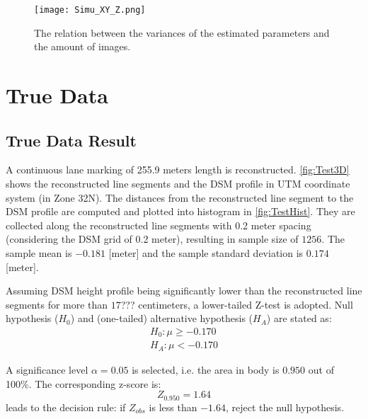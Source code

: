 \begin{figure}
  \centering
  \texttt{[image: Simu\_XY\_Z.png]}
  \caption{\small The relation between the variances of the estimated parameters and the amount of images.}
  \label{fig:SimuSigmaxx}
\end{figure}

\clearpage
\section{True Data}
\label{sec:truedata}

\subsection{True Data Result}
\label{subsec:trueresult}

A continuous lane marking of 255.9 meters length is reconstructed. \cref{fig:Test3D} shows the reconstructed line segments and the DSM profile in UTM coordinate system (in Zone 32N). The distances from the reconstructed line segment to the DSM profile are computed and plotted into histogram in \cref{fig:TestHist}. They are collected along the reconstructed line segments with 0.2 meter spacing (considering the DSM grid of 0.2 meter), resulting in sample size of $1256$. The sample mean is $-0.181$ [meter] and the sample standard deviation is $0.174$ [meter]. %

Assuming DSM height profile being significantly lower than the reconstructed line segments for more than $17$??? centimeters, a lower-tailed Z-test is adopted. Null hypothesis ($H_0$) and (one-tailed) alternative hypothesis ($H_A$) are stated as:
\begin{equation*}
\begin{split}
H_0: \mu\geq-0.170\\
H_A: \mu<-0.170
\end{split}
\end{equation*}

A significance level $\alpha=0.05$ is selected, i.e. the area in body is $0.950$ out of 100\%. The corresponding z-score is:
\begin{equation*}
Z_{0.950}=1.64
\end{equation*}
leads to the decision rule: if $Z_{obs}$ is less than $-1.64$, reject the null hypothesis.

